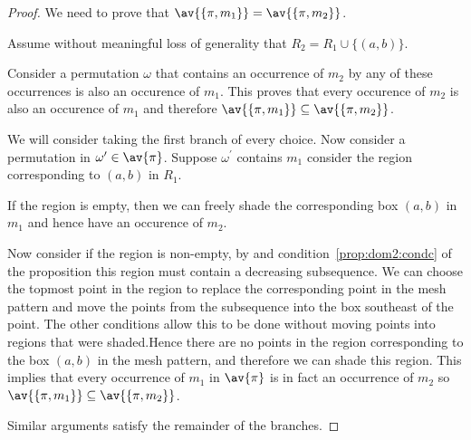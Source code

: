 \begin{proof}
    We need to prove that \(\av{\{\pi,m_1\}} = \av{\{\pi,m_2\}}\).

    Assume without meaningful loss of generality that \(R_2 = R_1 \cup \{(a,b)\}\).

    Consider a permutation \(\omega\) that contains an occurrence of \(m_2\)
    by  any of these occurrences is also an occurence
    of \(m_1\). This proves that every occurence of \(m_2\) is also an
    occurence of \(m_1\) and therefore \(\av{\{\pi,m_1\}} \subseteq \av{\{\pi,m_2\}}\).

    We will consider taking the first branch of every choice.
    Now consider a permutation in \(\omega^\prime \in \av{\pi}\). Suppose
    \(\omega^\prime\) contains \(m_1\) consider the region corresponding to
    \((a,b)\) in \(R_1\).

    If the region is empty, then we can freely shade the corresponding
    box \((a,b)\) in \(m_1\) and hence have an occurence of \(m_2\).

    Now consider if the region is non-empty, by  and
    condition~\ref{prop:dom2:condc} of the proposition this region must contain
    a decreasing subsequence.
    We can choose the topmost point in the region to replace the corresponding
    point in the mesh pattern and move the points from the subsequence into
    the box southeast of the point. The other conditions allow this to be done
    without moving points into regions that were shaded.Hence there are no
    points in the region corresponding to the box \((a,b)\) in the mesh
    pattern, and therefore we can shade this region. This implies that every
    occurrence of \(m_1\) in \(\av{\pi}\) is in fact an occurrence of \(m_2\)
    so \(\av{\{\pi,m_1\}} \subseteq \av{\{\pi,m_2\}}\).

    Similar arguments satisfy the remainder of the branches.

\end{proof}
